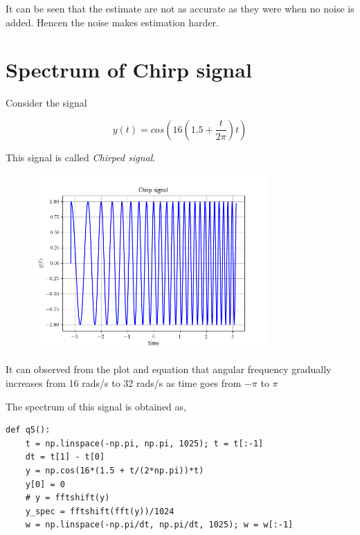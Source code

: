 \documentclass[12pt, a4paper]{article}
\begin{document}
It can be seen that the estimate are not as accurate as they were when no noise is added. Hencen the noise makes estimation harder.

\section{Spectrum of Chirp signal}

Consider the signal

\begin{equation*}
y(t) = cos \left( 16 \left( 1.5 + \frac{t}{2\pi} \right) t \right)
\end{equation*}

This signal is called \textit{Chirped signal}. 

\begin{figure}[H]
\centering
\includegraphics[width=0.8\textwidth]{q4_1.png}
\end{figure}

It can observed from the plot and equation that angular frequency gradually increases from 16 rads/s to 32 rads/s as time goes from $-\pi$ to $\pi$

The spectrum of this signal is obtained as,

\begin{lstlisting}
def q5():
    t = np.linspace(-np.pi, np.pi, 1025); t = t[:-1]
    dt = t[1] - t[0]
    y = np.cos(16*(1.5 + t/(2*np.pi))*t)
    y[0] = 0
    # y = fftshift(y)
    y_spec = fftshift(fft(y))/1024
    w = np.linspace(-np.pi/dt, np.pi/dt, 1025); w = w[:-1]
\end{lstlisting}
\end{document}
